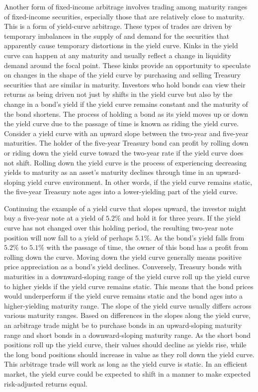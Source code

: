 \documentclass[11pt]{article}
\begin{document}
Another form of fixed-income arbitrage involves trading among maturity ranges of fixed-income securities, especially those that are relatively close to maturity. This is a form of yield-curve arbitrage. These types of trades are driven by temporary imbalances in the supply of and demand for the securities that apparently cause temporary distortions in the yield curve. Kinks in the yield curve can happen at any maturity and usually reflect a change in liquidity demand around the focal point. These kinks provide an opportunity to speculate on changes in the shape of the yield curve by purchasing and selling Treasury securities that are similar in maturity. Investors who hold bonds can view their returns as being driven not just by shifts in the yield curve but also by the change in a bond's yield if the yield curve remains constant and the maturity of the bond shortens. The process of holding a bond as its yield moves up or down the yield curve due to the passage of time is known as riding the yield curve. Consider a yield curve with an upward slope between the two-year and five-year maturities. The holder of the five-year Treasury bond can profit by rolling down or riding down the yield curve toward the two-year rate if the yield curve does not shift. Rolling down the yield curve is the process of experiencing decreasing yields to maturity as an asset's maturity declines through time in an upward-sloping yield curve environment. In other words, if the yield curve remains static, the five-year Treasury note ages into a lower-yielding part of the yield curve.

Continuing the example of a yield curve that slopes upward, the investor might buy a five-year note at a yield of $5.2 \%$ and hold it for three years. If the yield curve has not changed over this holding period, the resulting two-year note position will now fall to a yield of perhaps $5.1 \%$. As the bond's yield falls from $5.2 \%$ to $5.1 \%$ with the passage of time, the owner of this bond has a profit from rolling down the curve. Moving down the yield curve generally means positive price appreciation as a bond's yield declines. Conversely, Treasury bonds with maturities in a downward-sloping range of the yield curve roll up the yield curve to higher yields if the yield curve remains static. This means that the bond prices would underperform if the yield curve remains static and the bond ages into a higher-yielding maturity range. The slope of the yield curve usually differs across various maturity ranges. Based on differences in the slopes along the yield curve, an arbitrage trade might be to purchase bonds in an upward-sloping maturity range and short bonds in a downward-sloping maturity range. As the short bond positions roll up the yield curve, their values should decline as yields rise, while the long bond positions should increase in value as they roll down the yield curve. This arbitrage trade will work as long as the yield curve is static. In an efficient market, the yield curve could be expected to shift in a manner to make expected risk-adjusted returns equal.
\end{document}
